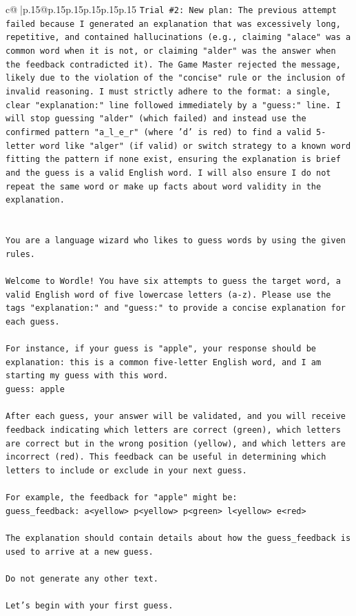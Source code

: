 \documentclass{article}
\begin{document}
{\begin{supertabular}{c@{$\;$}|p{.15\linewidth}@{}p{.15\linewidth}p{.15\linewidth}p{.15\linewidth}p{.15\linewidth}p{.15\linewidth}}
{{{\texttt{Trial \#2: New plan: The previous attempt failed because I generated an explanation that was excessively long, repetitive, and contained hallucinations (e.g., claiming "alace" was a common word when it is not, or claiming "alder" was the answer when the feedback contradicted it). The Game Master rejected the message, likely due to the violation of the "concise" rule or the inclusion of invalid reasoning. I must strictly adhere to the format: a single, clear "explanation:" line followed immediately by a "guess:" line. I will stop guessing "alder" (which failed) and instead use the confirmed pattern "a\_l\_e\_r" (where 'd' is red) to find a valid 5{-}letter word like "alger" (if valid) or switch strategy to a known word fitting the pattern if none exist, ensuring the explanation is brief and the guess is a valid English word. I will also ensure I do not repeat the same word or make up facts about word validity in the explanation.} \\
\\ 
\\ 
\texttt{You are a language wizard who likes to guess words by using the given rules.} \\
\\ 
\texttt{Welcome to Wordle! You have six attempts to guess the target word, a valid English word of five lowercase letters (a{-}z). Please use the tags "explanation:" and "guess:" to provide a concise explanation for each guess.} \\
\\ 
\texttt{For instance, if your guess is "apple", your response should be} \\
\texttt{explanation: this is a common five{-}letter English word, and I am starting my guess with this word.} \\
\texttt{guess: apple} \\
\\ 
\texttt{After each guess, your answer will be validated, and you will receive feedback indicating which letters are correct (green), which letters are correct but in the wrong position (yellow), and which letters are incorrect (red). This feedback can be useful in determining which letters to include or exclude in your next guess.} \\
\\ 
\texttt{For example, the feedback for "apple" might be:} \\
\texttt{guess\_feedback: a<yellow> p<yellow> p<green> l<yellow> e<red>} \\
\\ 
\texttt{The explanation should contain details about how the guess\_feedback is used to arrive at a new guess.} \\
\\ 
\texttt{Do not generate any other text.} \\
\\ 
\texttt{Let's begin with your first guess.} \\
            }
        }
    }
     \\ \\


\end{supertabular}}
\end{document}
